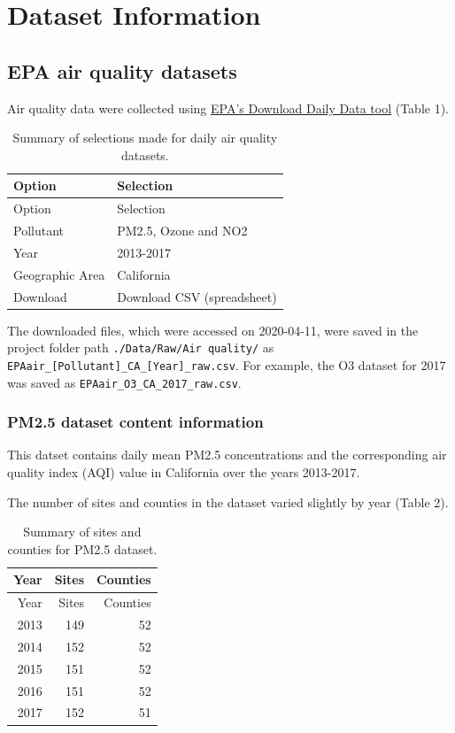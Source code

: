 \documentclass[12pt,]{article}
\begin{document}
\newpage

\hypertarget{dataset-information}{%
\section{Dataset Information}\label{dataset-information}}

\hypertarget{epa-air-quality-datasets}{%
\subsection{EPA air quality datasets}\label{epa-air-quality-datasets}}

Air quality data were collected using
\href{https://www.epa.gov/outdoor-air-quality-data/download-daily-data}{EPA's
Download Daily Data tool} (Table 1).

\begin{longtable}[]{@{}ll@{}}
\caption{Summary of selections made for daily air quality
datasets.}\tabularnewline
\toprule
Option & Selection\tabularnewline
\midrule
\endfirsthead
\toprule
Option & Selection\tabularnewline
\midrule
\endhead
Pollutant & PM2.5, Ozone and NO2\tabularnewline
Year & 2013-2017\tabularnewline
Geographic Area & California\tabularnewline
Download & Download CSV (spreadsheet)\tabularnewline
\bottomrule
\end{longtable}

The downloaded files, which were accessed on 2020-04-11, were saved in
the project folder path \texttt{./Data/Raw/Air\ quality/} as
\texttt{EPAair\_{[}Pollutant{]}\_CA\_{[}Year{]}\_raw.csv}. For example,
the O3 dataset for 2017 was saved as
\texttt{EPAair\_O3\_CA\_2017\_raw.csv}.

\hypertarget{pm2.5-dataset-content-information}{%
\subsubsection{PM2.5 dataset content
information}\label{pm2.5-dataset-content-information}}

This datset contains daily mean PM2.5 concentrations and the
corresponding air quality index (AQI) value in California over the years
2013-2017.

The number of sites and counties in the dataset varied slightly by year
(Table 2).

\begin{longtable}[]{@{}rrr@{}}
\caption{Summary of sites and counties for PM2.5
dataset.}\tabularnewline
\toprule
Year & Sites & Counties\tabularnewline
\midrule
\endfirsthead
\toprule
Year & Sites & Counties\tabularnewline
\midrule
\endhead
2013 & 149 & 52\tabularnewline
2014 & 152 & 52\tabularnewline
2015 & 151 & 52\tabularnewline
2016 & 151 & 52\tabularnewline
2017 & 152 & 51\tabularnewline
\bottomrule
\end{longtable}
\end{document}
